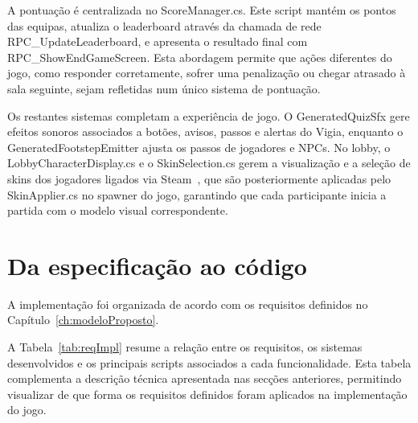 A pontuação é centralizada no ScoreManager.cs. Este script mantém os pontos das equipas, atualiza o leaderboard através da chamada de rede RPC\_UpdateLeaderboard, e apresenta o resultado final com RPC\_ShowEndGameScreen. Esta abordagem permite que ações diferentes do jogo, como responder corretamente, sofrer uma penalização ou chegar atrasado à sala seguinte, sejam refletidas num único sistema de pontuação.

Os restantes sistemas completam a experiência de jogo. O GeneratedQuizSfx gere efeitos sonoros associados a botões, avisos, passos e alertas do Vigia, enquanto o GeneratedFootstepEmitter ajusta os passos de jogadores e NPCs. No lobby, o LobbyCharacterDisplay.cs e o SkinSelection.cs gerem a visualização e a seleção de skins dos jogadores ligados via Steam~\cite{Labrecque2024}, que são posteriormente aplicadas pelo SkinApplier.cs no spawner do jogo, garantindo que cada participante inicia a partida com o modelo visual correspondente.


\section{Da especificação ao código}
\label{sec:especificacaoCodigo}

A implementação foi organizada de acordo com os requisitos definidos no Capítulo~\ref{ch:modeloProposto}.

A Tabela~\ref{tab:reqImpl} resume a relação entre os requisitos, os sistemas desenvolvidos e os principais scripts associados a cada funcionalidade. Esta tabela complementa a descrição técnica apresentada nas secções anteriores, permitindo visualizar de que forma os requisitos definidos foram aplicados na implementação do jogo.

